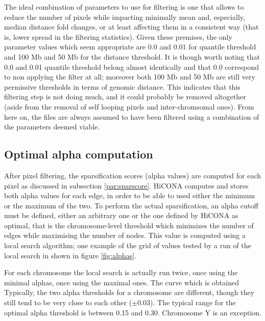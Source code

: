 The ideal combination of parameters to use for filtering is one that allows to reduce the number of pixels while impacting minimally mean and, especially, median distance fold changes, or at least affecting them in a consistent way (that is, lower spread in the filtering statistics). Given these premises, the only parameter values which seem appropriate are 0.0 and 0.01 for quantile threshold and 100 Mb and 50 Mb for the distance threshold. It is though worth noting that 0.0 and 0.01 quantile threshold belong almost identically and that 0.0 correspond to non applying the filter at all; moreover both 100 Mb and 50 Mb are still very permissive thresholds in terms of genomic distance. This indicates that this filtering step is not doing much, and it could probably be removed altogether (aside from the removal of self looping pixels and inter-chromsomal ones). From here on, the files are always assumed to have been filtered using a combination of the parameters deemed viable.


\subsection{Optimal alpha computation}

After pixel filtering, the sparsification scores (alpha values) are computed for each pixel as discussed in subsection \ref{par:sparscore}. HiCONA computes and stores both alpha values for each edge, in order to be able to used either the minimum or the maximum of the two. To perform the actual sparsification, an alpha cutoff must be defined, either an arbitrary one or the one defined by HiCONA as optimal, that is the chromosome-level threshold which minimizes the number of edges while maximising the number of nodes. This value is computed using a local search algorithm; one example of the grid of values tested by a run of the local search in shown in figure \ref{fig:alphas}.

For each chromosome the local search is actually run twice, once using the minimal alphas, once using the maximal ones. The curve which is obtained
Typically, the two alpha thresholds for a chromosome are different, though they still tend to be very close to each other ($\pm 0.03$). The typical range for the optimal alpha threshold is between 0.15 and 0.30. Chromosome Y is an exception. 


